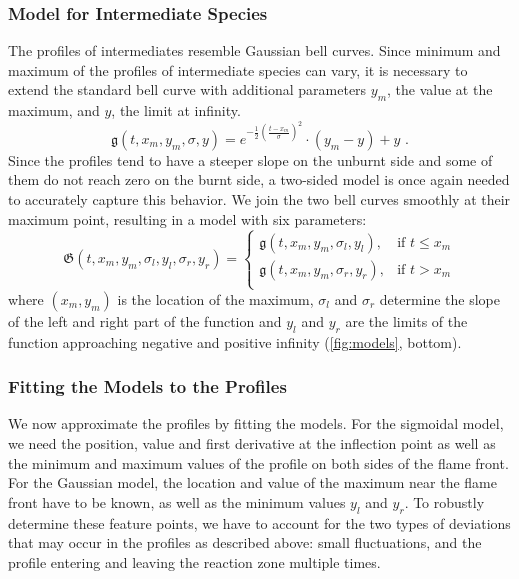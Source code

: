 \subsubsection{Model for Intermediate Species} %
\label{ssub:model_for_intermediate_species}
%
The profiles of intermediates resemble Gaussian bell curves. Since minimum and
maximum of the profiles of intermediate species can vary, it is necessary to
extend the standard bell curve with additional parameters $y_m$, the value at
the maximum, and $y$, the limit at infinity.
%
\begin{equation}
	\mathfrak{g}(t, x_m, y_m, \sigma, y)
		= e^{-\frac{1}{2}(\frac{t-x_m}{\sigma})^2}\cdot(y_m-y)+y \text{ .}
\end{equation}
%
Since the profiles tend to have a steeper slope on the unburnt side and some of
them do not reach zero on the burnt side, a two-sided model is once again needed
to accurately capture this behavior. We join the two bell curves smoothly at
their maximum point, resulting in a model with six parameters:
%
\begin{equation}
	\mathfrak{G}(t, x_m, y_m, \sigma_l, y_l, \sigma_r, y_r) =
	\begin{cases}
		\mathfrak{g}(t, x_m, y_m, \sigma_l, y_l), & \text{if }  t \leq x_m\\
		\mathfrak{g}(t, x_m, y_m, \sigma_r, y_r), & \text{if }  t > x_m\\
	\end{cases}
\end{equation}
%
where $(x_m, y_m)$ is the location of the maximum, $\sigma_l$ and $\sigma_r$
determine the slope of the left and right part of the function and $y_l$ and
$y_r$ are the limits of the function approaching negative and positive infinity
(\cref{fig:models}, bottom).
%
% 	
%
%
\subsubsection{Fitting the Models to the Profiles} %
\label{ssub:fitting_the_models}
%
We now approximate the profiles by fitting the models. For the sigmoidal model,
we need the position, value and first derivative at the inflection point as well
as the minimum and maximum values of the profile on both sides of the flame
front. For the Gaussian model, the location and value of the maximum near the
flame front have to be known, as well as the minimum values $y_l$ and $y_r$. To
robustly determine these feature points, we have to account for the two types of
deviations that may occur in the profiles as described above: small
fluctuations, and the profile entering and leaving the reaction zone multiple
times.

